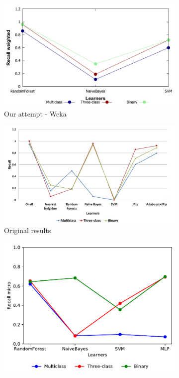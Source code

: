\begin{figure}[H]
    \centering
    \begin{subfigure}[t]{0.4\textwidth}
        \includegraphics[width=\linewidth]{images/weka_recallweight}
        \caption{Our attempt - Weka}
    \end{subfigure}%
    \begin{subfigure}[t]{0.4\textwidth}
        \includegraphics[width=\linewidth]{images/weka_recall_cite.png}
        \caption{Original results \cite{borges_hink_machine_2014-1}}
    \end{subfigure}
    \begin{subfigure}[t]{0.4\textwidth}
        \includegraphics[width=\linewidth, page = 3]{images/recall}

\end{subfigure}
\end{figure}
